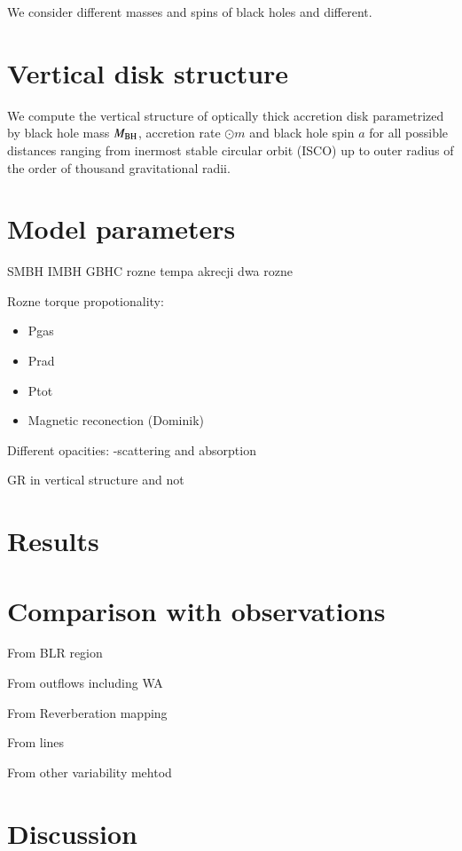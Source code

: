 \documentclass[preprint2]{aastex6}
\begin{document}
We consider different masses and spins of black holes and different. 



\section{Vertical disk structure}
\label{sec:mod}

We compute the vertical structure of optically thick accretion disk parametrized by black hole 
mass $M_{\rm BH}$, accretion rate $\odot m$ and black hole spin $a$ for all possible distances
ranging from inermost stable circular orbit (ISCO) up to outer radius of the order of thousand 
gravitational radii.   

\section{Model parameters}
\label{sec:param}

SMBH
IMBH
GBHC
rozne tempa akrecji dwa rozne 

Rozne torque propotionality:
\begin{itemize}
\item Pgas
\item Prad
\item Ptot 
\item Magnetic reconection (Dominik)
\end{itemize}

Different opacities:
-scattering and absorption 

GR in vertical structure and not 

\section{Results}


\section{Comparison with observations}
\label{sec:source}

From BLR region 

From outflows including WA 

From Reverberation mapping 

From lines 

From other variability mehtod 

\section{Discussion}
\label{sec:data}
\end{document}
